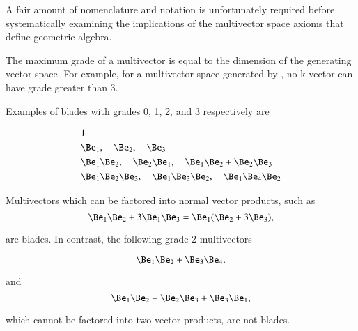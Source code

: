 %
%
A fair amount of nomenclature and notation is unfortunately required before systematically examining the implications of the multivector space axioms that define geometric algebra.


The maximum grade of a multivector is equal to the dimension of the generating vector space.
For example, for a multivector space generated by , no k-vector can have grade greater than 3.

Examples of blades with grades 0, 1, 2, and 3 respectively are

\begin{dmath}\label{eqn:multivector:180}
\begin{aligned}
&1 \\
&\Be_1,\quad \Be_2,\quad \Be_3 \\
&\Be_1 \Be_2,\quad \Be_2 \Be_1,\quad \Be_1 \Be_2 + \Be_2 \Be_3 \\
&\Be_1 \Be_2 \Be_3,\quad \Be_1 \Be_3 \Be_2,\quad \Be_1 \Be_4 \Be_2
\end{aligned}
\end{dmath}

Multivectors which can be factored into normal vector products, such as
\begin{dmath}\label{eqn:multiplication:220}
\Be_1 \Be_2 + 3 \Be_1 \Be_3
=
\Be_1 (\Be_2 + 3 \Be_3),
\end{dmath}

are blades.  In contrast, the following grade 2 multivectors

\begin{dmath}\label{eqn:multiplication:240}
\Be_1 \Be_2 + \Be_3 \Be_4,
\end{dmath}

and
\begin{dmath}\label{eqn:multiplication:260}
\Be_1 \Be_2 + \Be_2 \Be_3 + \Be_3 \Be_1,
\end{dmath}

which cannot be factored into two vector products, are not blades.

